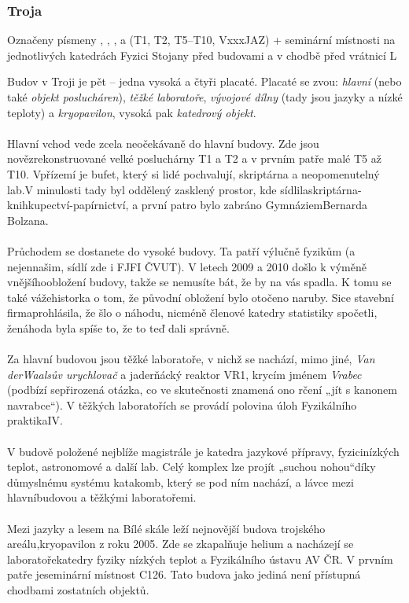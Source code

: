 \subsubsection{Troja}

{Označeny písmeny , , ,  a  (T1, T2, T5--T10,
VxxxJAZ) + seminární místnosti na
jednotlivých katedrách}
{Fyzici}
{Stojany před budovami a v chodbě před vrátnicí L}

\noindent Budov v Troji je pět – jedna vysoká a čtyři placaté. Placaté se zvou:
\textit{hlavní}
(nebo také \textit{objekt poslucháren}), \textit{těžké laboratoře},
\textit{vývojové dílny} (tady jsou
jazyky a nízké teploty) a \textit{kryopavilon}, vysoká pak \textit{katedrový
objekt}.
\\\\
Hlavní vchod vede zcela neočekávaně do hlavní budovy. Zde jsou
novězrekonstruované velké posluchárny T1 a T2 a v prvním patře malé T5 až T10.
Vpřízemí je bufet, který si lidé pochvalují, skriptárna a neopomenutelný lab.V
minulosti tady byl oddělený zasklený prostor, kde
sídlilaskriptárna-knihkupectví-papírnictví, a první patro bylo zabráno
GymnáziemBernarda Bolzana.
\\\\
Průchodem se dostanete do vysoké budovy. Ta patří výlučně fyzikům (a nejennašim,
sídlí zde i FJFI ČVUT). V letech 2009 a 2010 došlo k výměně vnějšíhoobložení
budovy, takže se nemusíte bát, že by na vás spadla. K tomu se také vážehistorka
o tom, že původní obložení bylo otočeno naruby. Sice stavební firmaprohlásila,
že šlo o náhodu, nicméně členové katedry statistiky spočetli, ženáhoda byla
spíše to, že to teď dali správně.
\\\\
Za hlavní budovou jsou těžké laboratoře, v nichž se nachází, mimo jiné,
\textit{Van derWaalsův urychlovač} a jaderňácký reaktor VR1, krycím jménem
\textit{Vrabec} (podbízí sepřirozená otázka, co ve skutečnosti znamená ono rčení
„jít s kanonem navrabce“). V těžkých laboratořích se provádí polovina úloh
Fyzikálního praktikaIV.
\\\\
V budově položené nejblíže magistrále je katedra jazykové přípravy,
fyzicinízkých teplot, astronomové a další lab. Celý komplex lze projít „suchou
nohou“díky důmyslnému systému katakomb, který se pod ním nachází, a lávce mezi
hlavníbudovou a těžkými laboratořemi.
\\\\
Mezi jazyky a lesem na Bílé skále leží nejnovější budova trojského
areálu,kryopavilon z roku 2005. Zde se zkapalňuje helium a nacházejí se
laboratořekatedry fyziky nízkých teplot a Fyzikálního ústavu AV ČR. V prvním
patře jeseminární místnost C126. Tato budova jako jediná není přístupná chodbami
zostatních objektů.